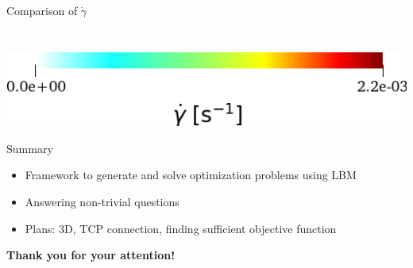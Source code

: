 \documentclass[aspectratio=169,xcolor=dvipsnames]{beamer}
\begin{document}
\begin{frame}{Comparison of $ \dot{\gamma} $}
\begin{columns}
\begin{column}{.42\textwidth}
\begin{figure}
			\end{figure}
		\end{column}
	\end{columns}
	\centering
	\vspace{3mm}
	\includegraphics[width=0.35	\textwidth, trim={0 0 0mm 0mm}, clip]{Images/tcpc_dotgamma_dotgamma_ legenda.png}
\end{frame}


\begin{frame}{Summary}
	\begin{itemize}
		\setlength\itemsep{1.4em}
		\item Framework to generate and solve optimization problems using LBM
		\item Answering non-trivial questions
		\item Plans: 3D, TCP connection, finding sufficient objective function
	\end{itemize}\pause
	\vspace{9mm}
	\huge{\centerline{\textbf{Thank you for your attention!}}}
\end{frame}
%
%

%

\end{document}
